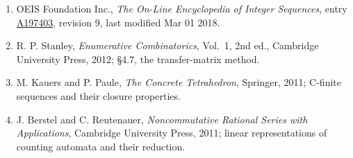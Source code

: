\documentclass[11pt]{article}
\theoremstyle{definition}
\begin{document}
\begin{enumerate}

\item OEIS Foundation Inc., \emph{The On-Line Encyclopedia of Integer Sequences}, entry \href{https://oeis.org/A197403}{A197403}, revision 9, last modified Mar 01 2018.

\item R. P. Stanley, \emph{Enumerative Combinatorics}, Vol.~1, 2nd ed., Cambridge University Press, 2012; \S4.7, the transfer-matrix method.

\item M. Kauers and P. Paule, \emph{The Concrete Tetrahedron}, Springer, 2011; C-finite sequences and their closure properties.

\item J. Berstel and C. Reutenauer, \emph{Noncommutative Rational Series with Applications}, Cambridge University Press, 2011; linear representations of counting automata and their reduction.

\end{enumerate}
\end{document}
